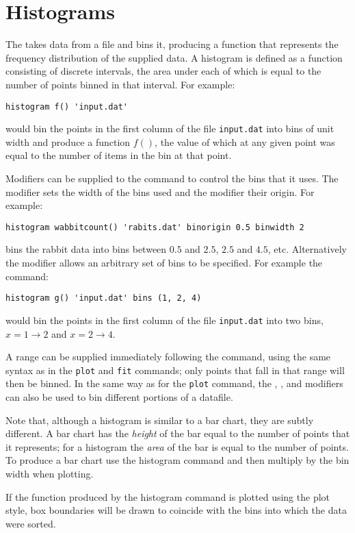 \section{Histograms}

The  takes data from a file and bins it, producing a
function that represents the frequency distribution of the supplied data.  A
histogram is defined as a function consisting of discrete intervals, the area
under each of which is equal to the number of points binned in that interval.
For example:

\begin{verbatim}
histogram f() 'input.dat'
\end{verbatim}

\noindent would bin the points in the first column of the file {\tt input.dat}
into bins of unit width and produce a function $f()$, the value of which at any
given point was equal to the number of items in the bin at that point.

Modifiers can be supplied to the  command to control the bins
that it uses.  The  modifier sets the width of the bins used
and the  modifier their origin.  For example:

\begin{verbatim}
histogram wabbitcount() 'rabits.dat' binorigin 0.5 binwidth 2
\end{verbatim}

\noindent bins the rabbit data into bins between $0.5$ and $2.5$, $2.5$ and
$4.5$, etc.  Alternatively the  modifier allows an arbitrary set
of bins to be specified. For example the command:

\begin{verbatim}
histogram g() 'input.dat' bins (1, 2, 4)
\end{verbatim}

\noindent would bin the points in the first column of the file {\tt input.dat}
into two bins, $x=1\to 2$ and $x=2\to 4$.

A range can be supplied immediately following the command, using the same
syntax as in the {\tt plot} and {\tt fit} commands; only points that fall in
that range will then be binned.  In the same way as for the {\tt plot} command,
the , ,  and 
modifiers can also be used to bin different portions of a datafile.

Note that, although a histogram is similar to a bar chart, they are subtly
different.  A bar chart has the {\it height} of the bar equal to the number of
points that it represents; for a histogram the {\it area} of the bar is equal to
the number of points.  To produce a bar chart use the histogram
command and then multiply by the bin width when plotting.

If the function produced by the histogram command is plotted using the
 plot style, box boundaries will be drawn to coincide with the
bins into which the data were sorted.
